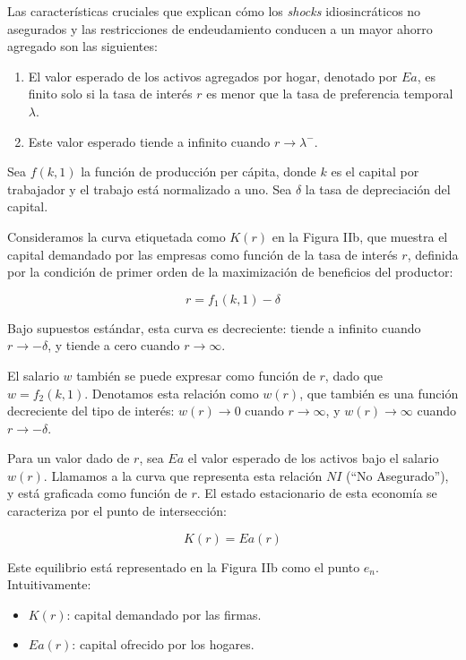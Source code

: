 \documentclass[a4paper,12pt]{article}
\begin{document}
Las características cruciales que explican cómo los \textit{shocks} idiosincráticos no asegurados y las restricciones de endeudamiento conducen a un mayor ahorro agregado son las siguientes:

\begin{enumerate}
	\item El valor esperado de los activos agregados por hogar, denotado por \( E a \), es finito solo si la tasa de interés \( r \) es menor que la tasa de preferencia temporal \( \lambda \).
	\item Este valor esperado tiende a infinito cuando \( r \to \lambda^- \).
\end{enumerate}

Sea \( f(k,1) \) la función de producción per cápita, donde \( k \) es el capital por trabajador y el trabajo está normalizado a uno. Sea \( \delta \) la tasa de depreciación del capital.

Consideramos la curva etiquetada como \( K(r) \) en la Figura IIb, que muestra el capital demandado por las empresas como función de la tasa de interés \( r \), definida por la condición de primer orden de la maximización de beneficios del productor:

		\begin{equation}
r = f_1(k,1) - \delta
		\end{equation}

Bajo supuestos estándar, esta curva es decreciente: tiende a infinito cuando \( r \to -\delta \), y tiende a cero cuando \( r \to \infty \).

El salario \( w \) también se puede expresar como función de \( r \), dado que \( w = f_2(k,1) \). Denotamos esta relación como \( w(r) \), que también es una función decreciente del tipo de interés: \( w(r) \to 0 \) cuando \( r \to \infty \), y \( w(r) \to \infty \) cuando \( r \to -\delta \).

Para un valor dado de \( r \), sea \( E a \) el valor esperado de los activos bajo el salario \( w(r) \). Llamamos a la curva que representa esta relación \( NI \) (``No Asegurado''), y está graficada como función de \( r \). El estado estacionario de esta economía se caracteriza por el punto de intersección:

		\begin{equation}
K(r) = E a(r)
		\end{equation}
		
Este equilibrio está representado en la Figura IIb como el punto \( e_n \). Intuitivamente:
\begin{itemize}
	\item \( K(r) \): capital demandado por las firmas.
	\item \( E a(r) \): capital ofrecido por los hogares.
\end{itemize}
\end{document}
